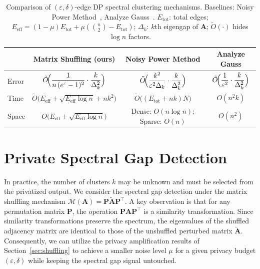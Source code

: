 \documentclass[11pt]{article}
\theoremstyle{plain}
\theoremstyle{definition}
\theoremstyle{remark}
\begin{document}
\begin{table}[h!]
\centering
\caption{Comparison of $(\varepsilon, \delta)$-edge DP spectral clustering mechanisms.  
Baselines: Noisy Power Method~\citep{hardt2014noisy}, 
Analyze Gauss~\citep{dwork2014analyze}.
$E_{\text{tot}}$: total edges; 
${E}_{\text{eff}}= (1-\mu)E_{\text{tot}}+\mu(\binom{n}{2}-E_{\text{tot}})$;
$\Delta_k$: $k$th eigengap of $\mathbf{A}$;
$\tilde{O}(\cdot)$ hides $\log n$ factors.}
\label{tab:mechanisms_summary}
\begin{tabular}{@{}lccc@{}}
\toprule
& \textbf{Matrix Shuffling (ours)} 
& \textbf{Noisy Power Method} 
& \textbf{Analyze Gauss} \\
\midrule
Error  
& $\tilde{O}\!\Bigl(\dfrac{1}{n\,(e^{\varepsilon}-1)^2}\cdot\dfrac{k}{\Delta_k^{2}}\Bigr)$ 
& $\tilde{O}\!\Bigl(\dfrac{k^{2}}{\varepsilon^2 \Delta_k}\cdot\dfrac{k}{\Delta_k^{2}}\Bigr)$ 
& $\tilde{O}\!\Bigl(\dfrac{1}{\varepsilon^2}\cdot\dfrac{k}{\Delta_k^{2}}\Bigr)$ \\[8pt]
Time  
& $\tilde{O}\!\bigl({E}_{\text{eff}} + \sqrt{{E}_{\text{eff}} \log n} + nk^{2}\bigr)$
& $\tilde{O}\bigl((E_{\text{tot}} + nk)N\bigr)$ 
& $O(n^2 k)$ \\[4pt]
Space 
& $O\!\bigl(E_{\text{eff}} + \sqrt{{E}_{\text{eff}} \log n}\bigr)$
& Dense: $O(n\log n)$; Sparse: $O(n)$ 
& $O(n^2)$ \\
\bottomrule
\end{tabular}
\end{table}










\section{Private Spectral Gap Detection}

In practice, the number of clusters $k$ may be unknown and must be selected from the privatized output. We consider the spectral gap detection under the matrix shuffling mechanism $\mathcal{M}(\mathbf{A}) = \mathbf{P} \widetilde{\mathbf{A}} \mathbf{P}^{\top}$. A key observation is that for any permutation matrix $\mathbf{P}$, the operation $\mathbf{P} \mathbf{A} \mathbf{P}^{\top}$ is a similarity transformation. Since similarity transformations preserve the spectrum, the eigenvalues of the shuffled adjacency matrix are identical to those of the unshuffled perturbed matrix $\widetilde{\mathbf{A}}$. Consequently, we can utilize the privacy amplification results of Section~\ref{sec:shuffling} to achieve a smaller noise level $\mu$ for a given privacy budget $(\varepsilon, \delta)$ while keeping the spectral gap signal untouched.
\end{document}
